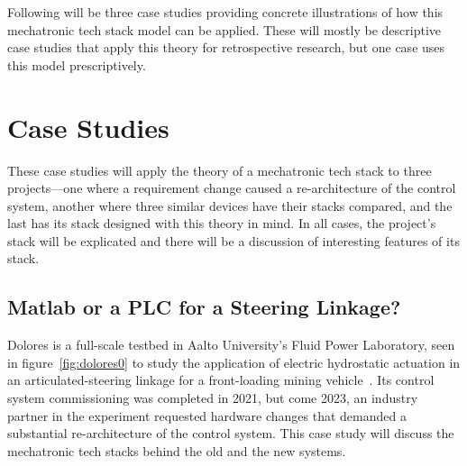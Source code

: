 \documentclass[english,12pt,a4paper,pdftex,eng,utf8]{aaltothesis}
\begin{document}
Following will be three case studies providing concrete illustrations of how this mechatronic tech stack model can be applied. These will mostly be descriptive case studies that apply this theory for retrospective research, but one case uses this model prescriptively.

\clearpage


\section{Case Studies}\label{sec:case_studies}

These case studies will apply the theory of a mechatronic tech stack to three projects---one where a requirement change caused a re-architecture of the control system, another where three similar devices have their stacks compared, and the last has its stack designed with this theory in mind. In all cases, the project's stack will be explicated and there will be a discussion of interesting features of its stack.

\subsection{Matlab or a PLC for a Steering Linkage?}

Dolores is a full-scale testbed in Aalto University's Fluid Power Laboratory, seen in figure~\ref{fig:dolores0} to study the application of electric hydrostatic actuation in an articulated-steering linkage for a front-loading mining vehicle~\cite{Hermansson2021, Helduser1999, Dudzinski1989}. Its control system commissioning was completed in 2021, but come 2023, an industry partner in the experiment requested hardware changes that demanded a substantial re-architecture of the control system. This case study will discuss the mechatronic tech stacks behind the old and the new systems.
\end{document}
